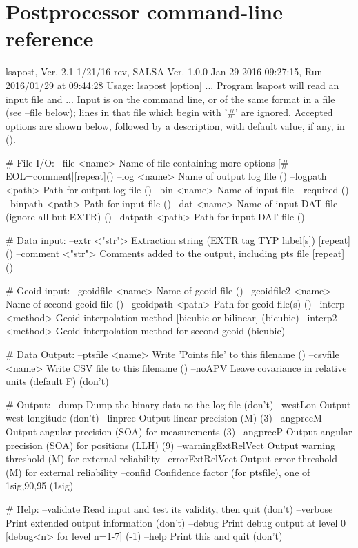\chapter{Postprocessor command-line reference}

\begin{Snippet}
lsapost, Ver. 2.1 1/21/16 rev, SALSA Ver. 1.0.0 Jan 29 2016 09:27:15,
 Run 2016/01/29 at 09:44:28
Usage: lsapost [option] ...
 Program lsapost will read an input file and ...
 Input is on the command line, or of the same format in a file (see --file below);
 lines in that file which begin with '#' are ignored. Accepted options are 
 shown below, followed by a description, with default value, if any, in ().

# File I/O:
 --file <name>       Name of file containing more options [#-EOL=comment][repeat]()
 --log <name>        Name of output log file ()
 --logpath <path>    Path for output log file ()
 --bin <name>        Name of input file - required ()
 --binpath <path>    Path for input file ()
 --dat <name>        Name of input DAT file (ignore all but EXTR) ()
 --datpath <path>    Path for input DAT file ()

# Data input:
 --extr <"str">      Extraction string (EXTR tag TYP label[s]) [repeat] ()
 --comment <"str">   Comments added to the output, including pts file [repeat] ()

# Geoid input:
 --geoidfile <name>  Name of geoid file ()
 --geoidfile2 <name> Name of second geoid file ()
 --geoidpath <path>  Path for geoid file(s) ()
 --interp <method>   Geoid interpolation method [bicubic or bilinear] (bicubic)
 --interp2 <method>  Geoid interpolation method for second geoid (bicubic)

# Data Output:
 --ptsfile <name>    Write 'Points file' to this filename ()
 --csvfile <name>    Write CSV file to this filename ()
 --noAPV             Leave covariance in relative units (default F) (don't)

# Output:
 --dump              Dump the binary data to the log file (don't)
 --westLon           Output west longitude (don't)
 --linprec           Output linear precision (M) (3)
 --angprecM          Output angular precision (SOA) for measurements (3)
 --angprecP          Output angular precision (SOA) for positions (LLH) (9)
 --warningExtRelVect Output warning threshold (M) for external reliability
 --errorExtRelVect   Output error threshold (M) for external reliability
 --confid            Confidence factor (for ptsfile), one of 1sig,90,95 (1sig)

# Help:
 --validate          Read input and test its validity, then quit (don't)
 --verbose           Print extended output information (don't)
 --debug             Print debug output at level 0 [debug<n> for level n=1-7] (-1)
 --help              Print this and quit (don't)
\end{Snippet}

